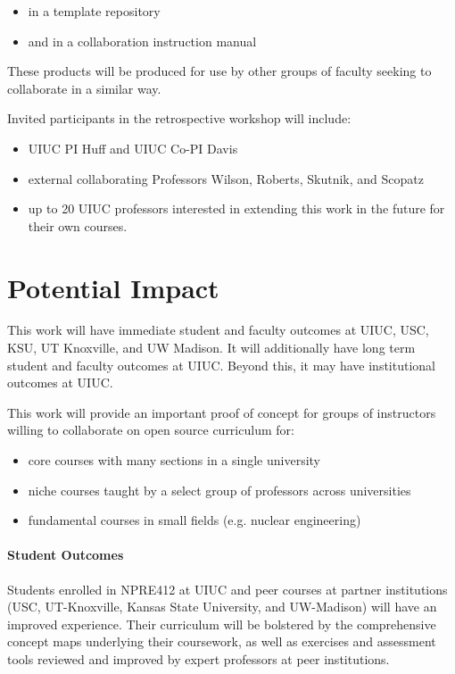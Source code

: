 \documentclass[11pt]{article}
\begin{document}
          \begin{itemize}
                  \item in a template repository 
                  \item and in a collaboration instruction manual 
          \end{itemize}

          These products will be produced for use by other groups of faculty 
          seeking to collaborate in a similar way.

          Invited participants in the retrospective workshop will include:

          \begin{itemize}
                  \item UIUC PI Huff and UIUC Co-PI Davis
                  \item external collaborating Professors Wilson, Roberts, 
                          Skutnik, and Scopatz
                  \item up to 20 UIUC professors interested in extending this 
                          work in the future for their own courses.
          \end{itemize}


          \section{Potential Impact}
          This work will have immediate student and faculty outcomes at UIUC, 
          USC, KSU, UT Knoxville, and UW Madison. It will additionally have long term 
          student and faculty outcomes at UIUC. Beyond this, it may have 
          institutional outcomes at UIUC. 
          
          This work will provide an important proof of concept for groups of 
          instructors willing to collaborate on open source curriculum for:
          \begin{itemize}
                  \item core courses with many sections in a single university
                  \item niche courses taught by a select group of professors across 
          universities
                  \item fundamental courses in small fields (e.g. nuclear engineering)
          \end{itemize}

          \paragraph{Student Outcomes}
          Students enrolled in NPRE412 at UIUC and peer courses at partner 
          institutions (USC, UT-Knoxville, Kansas State University, and 
          UW-Madison) will have an improved experience. Their 
          curriculum will be bolstered by the comprehensive concept maps 
          underlying their coursework\cite{concept_maps}, as well as exercises 
          and assessment tools reviewed and improved by expert professors at 
          peer institutions. 
\end{document}
